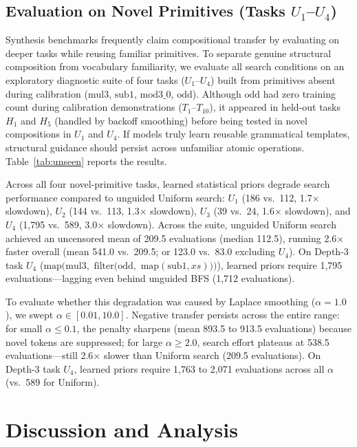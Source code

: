 \documentclass[10pt,twocolumn]{article}
\begin{document}
\subsection{Evaluation on Novel Primitives (\texorpdfstring{Tasks $U_1$--$U_4$}{Tasks U1--U4})}
Synthesis benchmarks frequently claim compositional transfer by evaluating on deeper tasks while reusing familiar primitives. To separate genuine structural composition from vocabulary familiarity, we evaluate all search conditions on an exploratory diagnostic suite of four tasks ($U_1$--$U_4$) built from primitives absent during calibration ($\text{mul3}$, $\text{sub1}$, $\text{mod3\_0}$, $\text{odd}$). Although $\text{odd}$ had zero training count during calibration demonstrations ($T_1$--$T_{10}$), it appeared in held-out tasks $H_1$ and $H_5$ (handled by backoff smoothing) before being tested in novel compositions in $U_1$ and $U_4$. If models truly learn reusable grammatical templates, structural guidance should persist across unfamiliar atomic operations. Table~\ref{tab:unseen} reports the results.

Across all four novel-primitive tasks, learned statistical priors degrade search performance compared to unguided Uniform search: $U_1$ (186 vs.\ 112, 1.7$\times$ slowdown), $U_2$ (144 vs.\ 113, 1.3$\times$ slowdown), $U_3$ (39 vs.\ 24, 1.6$\times$ slowdown), and $U_4$ (1,795 vs.\ 589, 3.0$\times$ slowdown). Across the suite, unguided Uniform search achieved an uncensored mean of 209.5 evaluations (median 112.5), running 2.6$\times$ faster overall (mean 541.0 vs.\ 209.5; or 123.0 vs.\ 83.0 excluding $U_4$). On Depth-3 task $U_4$ ($\text{map}(\text{mul3},$ $\text{filter}(\text{odd},$ $\text{map}(\text{sub1}, xs)))$), learned priors require 1,795 evaluations---lagging even behind unguided BFS (1,712 evaluations).

To evaluate whether this degradation was caused by Laplace smoothing ($\alpha = 1.0$), we swept $\alpha \in [0.01, 10.0]$. Negative transfer persists across the entire range: for small $\alpha \le 0.1$, the penalty sharpens (mean 893.5 to 913.5 evaluations) because novel tokens are suppressed; for large $\alpha \ge 2.0$, search effort plateaus at 538.5 evaluations---still 2.6$\times$ slower than Uniform search (209.5 evaluations). On Depth-3 task $U_4$, learned priors require 1,763 to 2,071 evaluations across all $\alpha$ (vs.\ 589 for Uniform).

\section{Discussion and Analysis}
\end{document}
